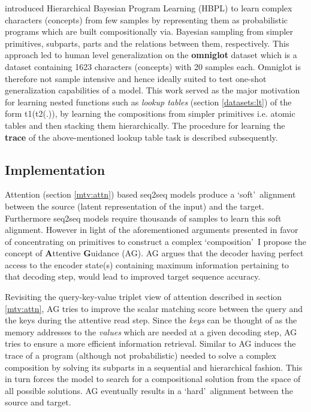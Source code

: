 \cite{Lake2015} introduced Hierarchical Bayesian Program Learning (HBPL) to learn complex characters (concepts) from few samples by representing them as probabilistic programs which are built compositionally via. Bayesian sampling from simpler primitives, subparts, parts and the relations between them, respectively. This approach led to human level generalization on the \textbf{omniglot} dataset \citep{Lake2015} which is a dataset containing 1623 characters (concepts) with 20 samples each. Omniglot is therefore not sample intensive and hence ideally suited to test one-shot generalization capabilities of a model. This work served as the major motivation for learning nested functions such as \textit{lookup tables} (section \ref{datasets:lt}) of the form t1(t2(.)), by learning the compositions from simpler primitives i.e. atomic tables and then stacking them hierarchically. The procedure for learning the \textbf{trace} of the above-mentioned lookup table task is described subsequently.

\subsection{Implementation}

Attention (section \ref{mtv:attn}) based seq2seq models produce a \lq soft{}\rq\ alignment between the source (latent representation of the input) and the target. Furthermore seq2seq models require thousands of samples to learn this soft alignment. However in light of the aforementioned arguments presented in favor of concentrating on primitives to construct a complex \lq composition{}\rq\ I propose the concept of \textbf{A}ttentive \textbf{G}uidance (AG). AG argues that the decoder having perfect access to the encoder state(s) containing maximum information pertaining to that decoding step, would lead to improved target sequence accuracy.


Revisiting the query-key-value triplet view of attention described in section \ref{mtv:attn}, AG tries to improve the scalar matching score between the query and the keys during the attentive read step. Since the \textit{keys} can be thought of as the memory addresses to the \textit{values} which are needed at a given decoding step, AG tries to ensure a more efficient information retrieval. Similar to \cite{Lake2015} AG induces the trace of a program (although not probabilistic) needed to solve a complex composition by solving its subparts in a sequential and hierarchical fashion. This in turn forces the model to search for a compositional solution from the space of all possible solutions. AG eventually results in a \lq hard{}\rq\ alignment between the source and target.


